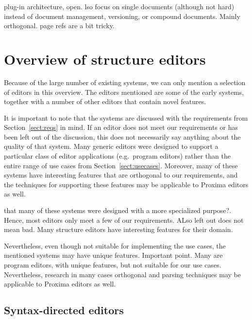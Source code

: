 \documentclass{speauth}
\begin{document}
plug-in architecture, open.
lso focus on single documents (although not hard) 
instead of document management, versioning, or compound documents. Mainly orthogonal.
page refs are a bit tricky.
\ec







%																
%																
%																
\section{Overview of structure editors} \label{sect:editorOverview}

Because of the large number of existing systems, we can only mention a selection of editors in this overview. The editors mentioned are some of the early systems, together with a number of other editors that contain novel features.


It is important to note that the systems are discussed with the requirements from Section~\ref{sect:reqs} in mind. If an editor does not meet our requirements or has been left out of the discussion, this does not necessarily say anything about the quality of that system. Many generic editors were designed to support  a particular class of editor applications (e.g.\ program editors) rather than the entire range of use cases from Section~\ref{sect:usecases}. Moreover, many of these systems have interesting features that are orthogonal to our requirements, and the techniques for supporting these features may be applicable to Proxima editors as well.


\bc
that many of these systems were designed with a more specialized purpose?. Hence, most editors only meet a few of our requirements. ALso left out does not mean bad. Many structure editors have interesting features for their domain. 

Nevertheless, even though not suitable for implementing the use cases, the mentioned systems may have unique features.  
Important point.
Many are program editors, with unique features, but not suitable for our use cases. Nevertheless, research in many cases orthogonal and parsing techniques may be applicable to Proxima editors as well.
\fromHere
\ec

%																
\subsection{Syntax-directed editors} \label{sect:synDirEditors}
\end{document}
